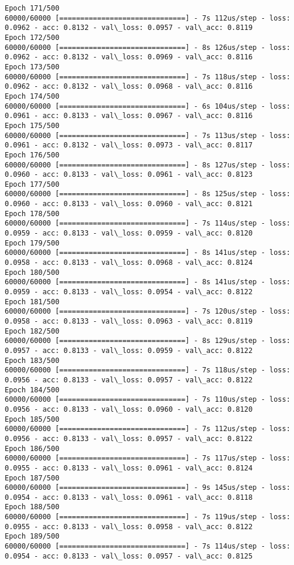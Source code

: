 \documentclass[11pt]{article}
\begin{document}
\begin{Verbatim}[commandchars=\\\{\}]
Epoch 171/500
60000/60000 [==============================] - 7s 112us/step - loss: 0.0962 - acc: 0.8132 - val\_loss: 0.0957 - val\_acc: 0.8119
Epoch 172/500
60000/60000 [==============================] - 8s 126us/step - loss: 0.0962 - acc: 0.8132 - val\_loss: 0.0969 - val\_acc: 0.8116
Epoch 173/500
60000/60000 [==============================] - 7s 118us/step - loss: 0.0962 - acc: 0.8132 - val\_loss: 0.0968 - val\_acc: 0.8116
Epoch 174/500
60000/60000 [==============================] - 6s 104us/step - loss: 0.0961 - acc: 0.8133 - val\_loss: 0.0967 - val\_acc: 0.8116
Epoch 175/500
60000/60000 [==============================] - 7s 113us/step - loss: 0.0961 - acc: 0.8132 - val\_loss: 0.0973 - val\_acc: 0.8117
Epoch 176/500
60000/60000 [==============================] - 8s 127us/step - loss: 0.0960 - acc: 0.8133 - val\_loss: 0.0961 - val\_acc: 0.8123
Epoch 177/500
60000/60000 [==============================] - 8s 125us/step - loss: 0.0960 - acc: 0.8133 - val\_loss: 0.0960 - val\_acc: 0.8121
Epoch 178/500
60000/60000 [==============================] - 7s 114us/step - loss: 0.0959 - acc: 0.8133 - val\_loss: 0.0959 - val\_acc: 0.8120
Epoch 179/500
60000/60000 [==============================] - 8s 141us/step - loss: 0.0958 - acc: 0.8133 - val\_loss: 0.0968 - val\_acc: 0.8124
Epoch 180/500
60000/60000 [==============================] - 8s 141us/step - loss: 0.0959 - acc: 0.8133 - val\_loss: 0.0954 - val\_acc: 0.8122
Epoch 181/500
60000/60000 [==============================] - 7s 120us/step - loss: 0.0958 - acc: 0.8133 - val\_loss: 0.0963 - val\_acc: 0.8119
Epoch 182/500
60000/60000 [==============================] - 8s 129us/step - loss: 0.0957 - acc: 0.8133 - val\_loss: 0.0959 - val\_acc: 0.8122
Epoch 183/500
60000/60000 [==============================] - 7s 118us/step - loss: 0.0956 - acc: 0.8133 - val\_loss: 0.0957 - val\_acc: 0.8122
Epoch 184/500
60000/60000 [==============================] - 7s 110us/step - loss: 0.0956 - acc: 0.8133 - val\_loss: 0.0960 - val\_acc: 0.8120
Epoch 185/500
60000/60000 [==============================] - 7s 112us/step - loss: 0.0956 - acc: 0.8133 - val\_loss: 0.0957 - val\_acc: 0.8122
Epoch 186/500
60000/60000 [==============================] - 7s 117us/step - loss: 0.0955 - acc: 0.8133 - val\_loss: 0.0961 - val\_acc: 0.8124
Epoch 187/500
60000/60000 [==============================] - 9s 145us/step - loss: 0.0954 - acc: 0.8133 - val\_loss: 0.0961 - val\_acc: 0.8118
Epoch 188/500
60000/60000 [==============================] - 7s 119us/step - loss: 0.0955 - acc: 0.8133 - val\_loss: 0.0958 - val\_acc: 0.8122
Epoch 189/500
60000/60000 [==============================] - 7s 114us/step - loss: 0.0954 - acc: 0.8133 - val\_loss: 0.0957 - val\_acc: 0.8125

\end{Verbatim}
\end{document}
